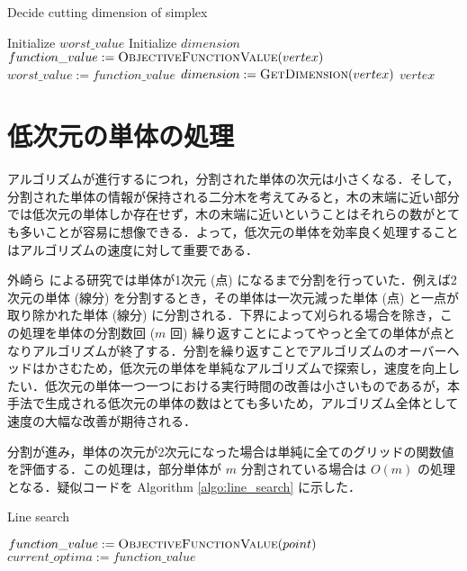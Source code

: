 \documentclass[a4paper,11pt]{jreport}
\begin{document}
\begin{algorithm}
\caption{Decide cutting dimension of simplex}
\label{algo:cutting_dimension}
\begin{algorithmic}[1]
\State Initialize $ worst\_value $
\State Initialize $ dimension $
\State $ function\_value := \Call{ObjectiveFunctionValue}{vertex} $
\State $ worst\_value := function\_value $
\State $ dimension := \Call{GetDimension}{vertex} $
\EndIf
\EndFor
\State \Return $ vertex $
\EndFunction
\end{algorithmic}
\end{algorithm}

\section{低次元の単体の処理}

アルゴリズムが進行するにつれ，分割された単体の次元は小さくなる．そして，分割された単体の情報が保持される二分木を考えてみると，木の末端に近い部分では低次元の単体しか存在せず，木の末端に近いということはそれらの数がとても多いことが容易に想像できる．よって，低次元の単体を効率良く処理することはアルゴリズムの速度に対して重要である．\par
外崎ら \cite{tonosaki} による研究では単体が1次元 (点) になるまで分割を行っていた．例えば2次元の単体 (線分) を分割するとき，その単体は一次元減った単体 (点) と一点が取り除かれた単体 (線分) に分割される．下界によって刈られる場合を除き，この処理を単体の分割数回 ($ m $ 回) 繰り返すことによってやっと全ての単体が点となりアルゴリズムが終了する．分割を繰り返すことでアルゴリズムのオーバーヘッドはかさむため，低次元の単体を単純なアルゴリズムで探索し，速度を向上したい．低次元の単体一つ一つにおける実行時間の改善は小さいものであるが，本手法で生成される低次元の単体の数はとても多いため，アルゴリズム全体として速度の大幅な改善が期待される．\par
分割が進み，単体の次元が2次元になった場合は単純に全てのグリッドの関数値を評価する．この処理は，部分単体が $ m $ 分割されている場合は $ O(m) $ の処理となる．疑似コードを Algorithm \ref{algo:line_search} に示した．\par

\begin{algorithm}
\caption{Line search}
\label{algo:line_search}
\begin{algorithmic}[1]
\State $ function\_value := \Call{ObjectiveFunctionValue}{point} $
\State $current\_optima := function\_value $
\EndIf
\EndFor
\EndFunction
\end{algorithmic}
\end{algorithm}
\end{document}
